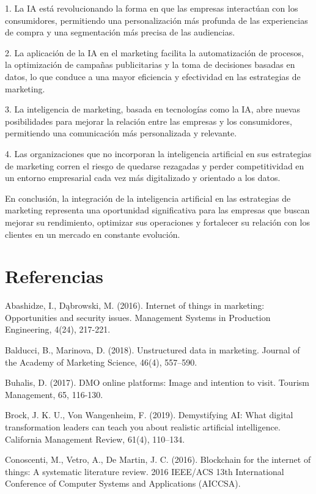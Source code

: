 \documentclass[a4paper, 12pt, twocolumn]{article}
\begin{document}
1. La IA está revolucionando la forma en que las empresas interactúan con los consumidores, permitiendo una personalización más profunda de las experiencias de compra y una segmentación más precisa de las audiencias.

2. La aplicación de la IA en el marketing facilita la automatización de procesos, la optimización de campañas publicitarias y la toma de decisiones basadas en datos, lo que conduce a una mayor eficiencia y efectividad en las estrategias de marketing.

3. La inteligencia de marketing, basada en tecnologías como la IA, abre nuevas posibilidades para mejorar la relación entre las empresas y los consumidores, permitiendo una comunicación más personalizada y relevante.

4. Las organizaciones que no incorporan la inteligencia artificial en sus estrategias de marketing corren el riesgo de quedarse rezagadas y perder competitividad en un entorno empresarial cada vez más digitalizado y orientado a los datos.

En conclusión, la integración de la inteligencia artificial en las estrategias de marketing representa una oportunidad significativa para las empresas que buscan mejorar su rendimiento, optimizar sus operaciones y fortalecer su relación con los clientes en un mercado en constante evolución.

\section*{Referencias}

Abashidze, I., Dąbrowski, M. (2016). Internet of things
in marketing: Opportunities and security issues. Management Systems in Production Engineering, 4(24), 217-221.

Balducci, B., Marinova, D. (2018). Unstructured data in
marketing. Journal of the Academy of Marketing Science, 46(4),
557–590.

Buhalis, D. (2017). DMO online platforms: Image and intention to visit. Tourism Management, 65, 116-130.

Brock, J. K. U., Von Wangenheim, F. (2019). Demystifying AI: What digital transformation leaders can teach you
about realistic artificial intelligence. California Management
Review, 61(4), 110–134.

Conoscenti, M., Vetro, A., De Martin, J. C. (2016). Blockchain for the internet of things: A systematic literature review. 2016 IEEE/ACS 13th International Conference of Computer Systems and Applications (AICCSA).
\end{document}
